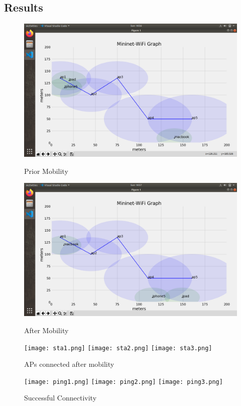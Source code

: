 \documentclass{article}
\begin{document}
\subsection{Results}
    \begin{figure}[h]
        \includegraphics[width=0.9\linewidth]{beforeMobility.png}
        \caption{Prior Mobility}
        \label{MininetGUI}
        \endminipage
        \includegraphics[width=0.9\linewidth]{afterMobility.png}
        \caption{After Mobility}
        \label{MininetGUI}
        \endminipage\vspace{10pt}
        \texttt{[image: sta1.png]}
        \texttt{[image: sta2.png]}
        \texttt{[image: sta3.png]}
        \caption{APs connected after mobility}
        \label{MininetCLI}
        \endminipage\vspace{10pt}
        \texttt{[image: ping1.png]}
        \texttt{[image: ping2.png]}
        \texttt{[image: ping3.png]}
        \caption{Successful Connectivity}
        \label{MininetCLI}
        \endminipage
    \end{figure}
\end{document}
